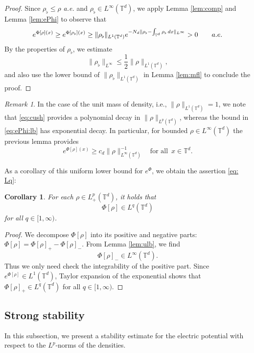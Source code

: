 \documentclass[11pt,reqno,a4paper]{amsart}
\newcommand{\intt}{\int_{\T^d}}
\newtheorem{corollary}[lemma]{Corollary}
\theoremstyle{definition}
\theoremstyle{remark}
\newtheorem{remark}[lemma]{Remark}
\numberwithin{equation}{section}
\newcommand{\T} {\mathbb T}
\newcommand{\dx}{\textnormal{d}x}
\begin{document}
\begin{proof}
Since $\rho_\flat \le \rho$ \textit{a.e.} and $\rho_\flat \in L^\infty(\T^d)$, 
we apply Lemma \ref{lem:comp} and Lemma \ref{lem:ePhi} to observe that
\[
 e^{\Phi[\rho](x)} \ge   e^{\Phi[\rho_{\flat}](x)} \ge \|\rho_{\flat}\|_{L^1(\T^d)} e^{-N_d\|\rho_\flat - \intt \rho_{\flat} \, \dx\|_{L^\infty}} > 0\qquad \textit{a.e.}
\]
By the properties of $\rho_\flat$, we estimate
\[
\|\rho_\flat\|_{L^\infty} \le \frac{1}{2}\|\rho\|_{L^1(\T^d)},
\]
and also use the lower bound of $\|\rho_\flat\|_{L^1(\T^d)}$ in Lemma \ref{lem:mfl} to conclude the proof.
\end{proof}

\begin{remark}
In the case of the unit mass of density, i.e., $\|\rho\|_{L^1(\T^d)} =1$, we note that \eqref{eq:cush} provides a polynomial decay in $\|\rho\|_{L^p(\T^d)}$, whereas the bound in \eqref{eq:ePhi:lb} has exponential decay. In particular, for bounded $\rho \in L^\infty(\T^d)$ the previous lemma provides
\[
e^{\Phi[\rho](x)} \ge c_d\|\rho\|_{L^\infty(\T^d)}^{-1} \quad \text{for all}\,\,\, x\in\T^d.
\]
\end{remark}

As a corollary of this uniform lower bound for $e^{\Phi}$, we obtain the assertion \eqref{eq: Lq}:
\begin{corollary}\label{cor:Lq}
For each $\rho \in L^p_+(\T^d)$, it holds that
\[
\Phi[\rho] \in L^q(\T^d)
\]
for all $q \in [1,\infty)$.
\end{corollary}
\begin{proof}
We decompose $\Phi[\rho]$ into its positive and negative parts: $\Phi[\rho] = \Phi[\rho]_+ - \Phi[\rho]_-$. From Lemma \ref{lem:ulb}, we find
\[
\Phi[\rho]_- \in L^\infty(\T^d).
\]
Thus we only need check the integrability of the positive part. Since $e^{\Phi[\rho]} \in L^1(\T^d)$, Taylor expansion of the exponential shows that
$\Phi[\rho]_+ \in L^q(\T^d)$
for all $q\in [1,\infty)$.
\end{proof}





%
%
%
%
%
\subsection{Strong stability}
In this subsection, we present a stability estimate for the electric potential with respect to the $L^p$-norms of the densities.
\end{document}
